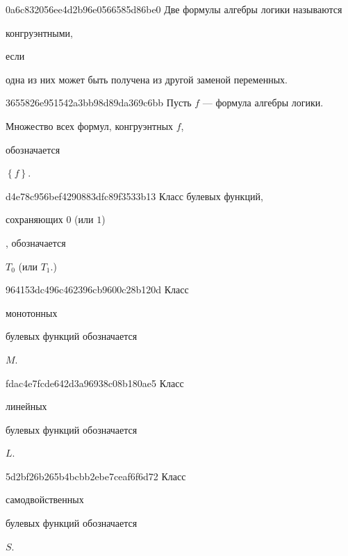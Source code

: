 \begin{note}{0a6c832056ee4d2b96e0566585d86be0}
    Две формулы алгебры логики называются \begin{icloze}{2}конгруэнтными,\end{icloze} если \begin{icloze}{1}одна из них может быть получена из другой заменой переменных.\end{icloze}
\end{note}

\begin{note}{3655826e951542a3bb98d89da369c6bb}
    Пусть \({ f }\) --- формула алгебры логики.
    \begin{icloze}{2}Множество всех формул, конгруэнтных \({ f }\),\end{icloze} обозначается \begin{icloze}{1}\({ \left\{ f \right\} }\).\end{icloze}
\end{note}

\begin{note}{d4e78c956bef4290883dfc89f3533b13}
    Класс булевых функций, \begin{icloze}{2}сохраняющих \({ 0 }\) (или \({ 1 }\))\end{icloze}, обозначается \begin{icloze}{1}\({ T_0 }\) (или \({ T_1 }\).)\end{icloze}
\end{note}

\begin{note}{964153dc496c462396cb9600c28b120d}
    Класс \begin{icloze}{2}монотонных\end{icloze} булевых функций обозначается \begin{icloze}{1}\({ M }\).\end{icloze}
\end{note}

\begin{note}{fdac4e7fcde642d3a96938c08b180ae5}
    Класс \begin{icloze}{2}линейных\end{icloze} булевых функций обозначается \begin{icloze}{1}\({ L }\).\end{icloze}
\end{note}

\begin{note}{5d2bf26b265b4bcbb2ebe7ceaf6f6d72}
    Класс \begin{icloze}{2}самодвойственных\end{icloze} булевых функций обозначается \begin{icloze}{1}\({ S }\).\end{icloze}
\end{note}

